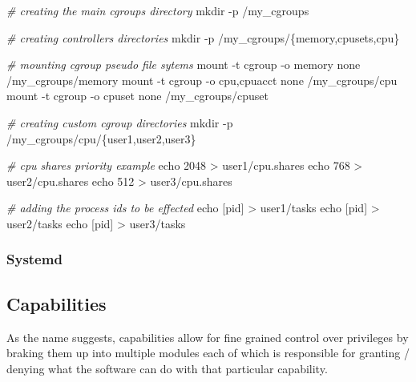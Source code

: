 \documentclass[
  14pt,
  english,
  a4paper,
]{scrreprt}
\newenvironment{Shaded}{}{}
\newcommand{\BuiltInTok}[1]{#1}
\newcommand{\CommentTok}[1]{\textcolor[rgb]{0.38,0.63,0.69}{\textit{#1}}}
\newcommand{\DataTypeTok}[1]{\textcolor[rgb]{0.56,0.13,0.00}{#1}}
\newcommand{\FunctionTok}[1]{\textcolor[rgb]{0.02,0.16,0.49}{#1}}
\newcommand{\NormalTok}[1]{#1}
\newcommand{\OperatorTok}[1]{\textcolor[rgb]{0.40,0.40,0.40}{#1}}
\begin{document}
\begin{Shaded}
\begin{Highlighting}[]
\CommentTok{\# creating the main cgroups directory}
\FunctionTok{mkdir}\NormalTok{ {-}p /my\_cgroups}

\CommentTok{\# creating controllers directories}
\FunctionTok{mkdir}\NormalTok{ {-}p /my\_cgroups/}\DataTypeTok{\{memory,cpusets,cpu\}}

\CommentTok{\# mounting cgroup pseudo file sytems}
\FunctionTok{mount}\NormalTok{ {-}t cgroup {-}o memory none /my\_cgroups/memory}
\FunctionTok{mount}\NormalTok{ {-}t cgroup {-}o cpu,cpuacct none /my\_cgroups/cpu}
\FunctionTok{mount}\NormalTok{ {-}t cgroup {-}o cpuset none /my\_cgroups/cpuset}

\CommentTok{\# creating custom cgroup directories}
\FunctionTok{mkdir}\NormalTok{ {-}p /my\_cgroups/cpu/}\DataTypeTok{\{user1,user2,user3\}}

\CommentTok{\# cpu shares priority example}
\BuiltInTok{echo}\NormalTok{ 2048 }\OperatorTok{\textgreater{}}\NormalTok{ user1/cpu.shares}
\BuiltInTok{echo}\NormalTok{ 768 }\OperatorTok{\textgreater{}}\NormalTok{ user2/cpu.shares}
\BuiltInTok{echo}\NormalTok{ 512 }\OperatorTok{\textgreater{}}\NormalTok{ user3/cpu.shares}

\CommentTok{\# adding the process id\textquotesingle{}s to be effected}
\BuiltInTok{echo}\NormalTok{ [pid] }\OperatorTok{\textgreater{}}\NormalTok{ user1/tasks}
\BuiltInTok{echo}\NormalTok{ [pid] }\OperatorTok{\textgreater{}}\NormalTok{ user2/tasks}
\BuiltInTok{echo}\NormalTok{ [pid] }\OperatorTok{\textgreater{}}\NormalTok{ user3/tasks}
\end{Highlighting}
\end{Shaded}

\hypertarget{systemd}{%
\subsubsection{Systemd}\label{systemd}}

\hypertarget{capabilities}{%
\subsection{Capabilities}\label{capabilities}}

As the name suggests, capabilities allow for fine grained control over
privileges by braking them up into multiple modules each of which is
responsible for granting / denying what the software can do with that
particular capability.
\end{document}
